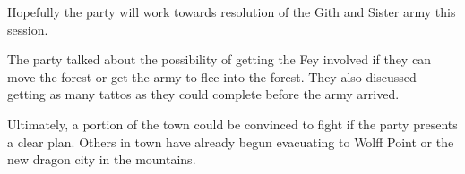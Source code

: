 Hopefully the party will work towards resolution of the Gith and Sister army this session.

The party talked about the possibility of getting the Fey involved if they can move the forest or get the army to flee into the forest.
They also discussed getting as many tattos as they could complete before the army arrived.

Ultimately, a portion of the town could be convinced to fight if the party presents a clear plan.
Others in town have already begun evacuating to Wolff Point or the new dragon city in the mountains.
